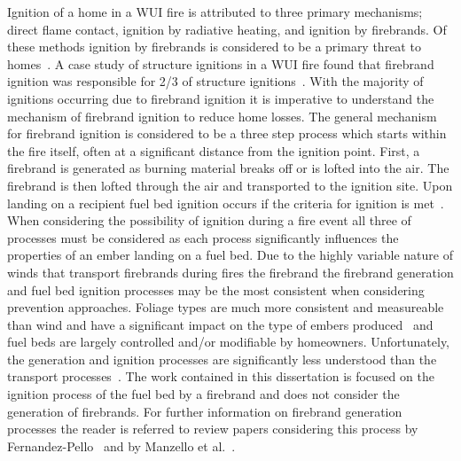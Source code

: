     Ignition of a home in a WUI fire is attributed to three primary mechanisms; direct flame contact, ignition by radiative heating, and ignition by firebrands. Of these methods ignition by firebrands is considered to be a primary threat to homes~\cite{Suzuki2021, Mell2010}. A case study of structure ignitions in a WUI fire found that firebrand ignition was responsible for 2/3 of structure ignitions~\cite{Mell2011}. With the majority of ignitions occurring due to firebrand ignition it is imperative to understand the mechanism of firebrand ignition to reduce home losses. The general mechanism for firebrand ignition is considered to be a three step process which starts within the fire itself, often at a significant distance from the ignition point. First, a firebrand is generated as burning material breaks off or is lofted into the air. The firebrand is then lofted through the air and transported to the ignition site. Upon landing on a recipient fuel bed ignition occurs if the criteria for ignition is met~\cite{Babrauskas2003}. When considering the possibility of ignition during a fire event all three of processes must be considered as each process significantly influences the properties of an ember landing on a fuel bed. Due to the highly variable nature of winds that transport firebrands during fires the firebrand the firebrand generation and fuel bed ignition processes may be the most consistent when considering prevention approaches. Foliage types are much more consistent and measureable than wind and have a significant impact on the type of embers produced~\cite{Hudson2020EffectsScale} and fuel beds are largely controlled and/or modifiable by homeowners. Unfortunately, the generation and ignition processes are significantly less understood than the transport processes~\cite{Manzello2020}. The work contained in this dissertation is focused on the ignition process of the fuel bed by a firebrand and does not consider the generation of firebrands. For further information on firebrand generation processes the reader is referred to review papers considering this process by Fernandez-Pello~\cite{Fernandez-Pello2017} and by Manzello et al.~\cite{Manzello2020}.
    
